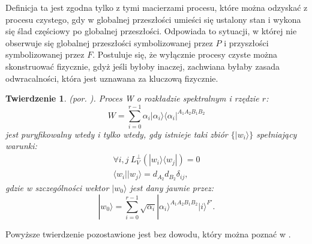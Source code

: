\documentclass[10pt]{article} %
\newtheorem{tw}{Twierdzenie}
\DeclareMathOperator{\Trs}{Tr}
\newcommand{\Ket}[1]{|#1\rangle}
\newcommand{\Bra}[1]{\langle#1|}
\newcommand{\BBra}[1]{\langle\langle#1|}
\newcommand{\KKet}[1]{|#1\rangle\rangle}
\newcommand{\I}{\mathbb{1}}
\newcommand{\LPV}{{L^\perp_V}}
\begin{document}
Definicja ta jest zgodna tylko z tymi macierzami procesu, które można odzyskać z procesu czystego, gdy w globalnej przeszłości umieści się ustalony stan i wykona się ślad częściowy po globalnej przeszłości. Odpowiada to sytuacji, w której nie obserwuje się globalnej przeszłości symbolizowanej przez $P$ i przyszłości symbolizowanej przez $F$.
Postuluje się, że wyłącznie procesy czyste można skonstruować fizycznie, gdyż jeśli byłoby inaczej, zachwiana byłaby zasada odwracalności, która jest uznawana za kluczową fizycznie. 
\begin{tw}
(por. \cite{purification}).
Proces W o rozkładzie spektralnym i rzędzie $r$:
\begin{equation}
W = \sum_{i=0}^{r-1} \alpha_i \Ket{\alpha_i}\Bra{\alpha_i}^{A_1A_2B_1B_2}
\end{equation}
jest puryfikowalny wtedy i tylko wtedy, gdy istnieje taki zbiór $\{\Ket{w_i}\}$ spełniający warunki:
\begin{gather}
\forall i,j~\LPV(\Ket{w_i}\Bra{w_j}) = 0\\
\Bra{w_i}\Ket{w_j} = d_{A_2}d_{B_2}\delta_{ij},
\end{gather}
gdzie w szczególności wektor $\Ket{w_0}$ jest dany jawnie przez:
\begin{equation}
\label{w0}
\Ket{w_0} = \sum_{i=0}^{r-1} \sqrt{\alpha_i} \Ket{\alpha_i}^{A_1A_2B_1B_2}\Ket{i}^{F'}.
\end{equation}
\end{tw} Powyższe twierdzenie pozostawione jest bez dowodu, który można poznać w \cite{purification}. %
\end{document}
